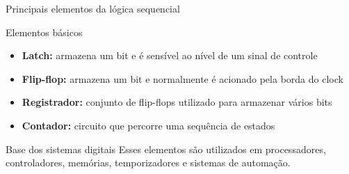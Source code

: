 
\begin{frame}{Principais elementos da lógica sequencial}

    \begin{block}{Elementos básicos}
        \begin{itemize}
            \item \textbf{Latch:} armazena um bit e é sensível ao nível
            de um sinal de controle
            \item \textbf{Flip-flop:} armazena um bit e normalmente é
            acionado pela borda do clock
            \item \textbf{Registrador:} conjunto de flip-flops utilizado
            para armazenar vários bits
            \item \textbf{Contador:} circuito que percorre uma sequência
            de estados
        \end{itemize}
    \end{block}

    \begin{alertblock}{Base dos sistemas digitais}
        Esses elementos são utilizados em processadores, controladores,
        memórias, temporizadores e sistemas de automação.
    \end{alertblock}

\end{frame}